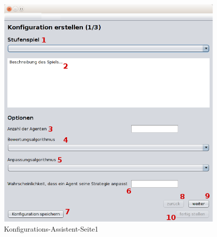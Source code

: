 \begin{figure}[hp] 
  \centering
     \includegraphics[width=1.0\textwidth]{GUI_Entwurf/WizardFenster1.png}
  \caption{Konfigurations-Assistent-Seite1}
  \label{fig:Bild2}
\end{figure}

